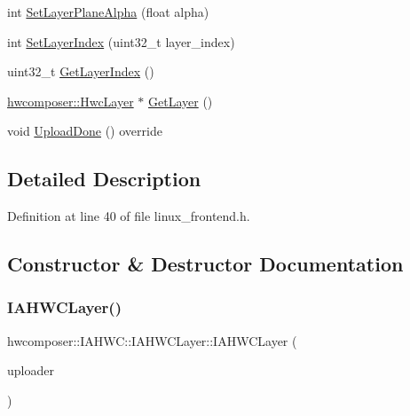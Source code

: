 \begin{DoxyCompactItemize}
\item 
int \mbox{\hyperlink{classhwcomposer_1_1IAHWC_1_1IAHWCLayer_ada748eee83ec62b8e3f242583ab2e0bb}{Set\+Layer\+Plane\+Alpha}} (float alpha)
\item 
int \mbox{\hyperlink{classhwcomposer_1_1IAHWC_1_1IAHWCLayer_a4e4374244d15639d4e94e6ac6aa33b92}{Set\+Layer\+Index}} (uint32\+\_\+t layer\+\_\+index)
\item 
uint32\+\_\+t \mbox{\hyperlink{classhwcomposer_1_1IAHWC_1_1IAHWCLayer_ad6659d6ae025b1945a6942bb53842930}{Get\+Layer\+Index}} ()
\item 
\mbox{\hyperlink{structhwcomposer_1_1HwcLayer}{hwcomposer\+::\+Hwc\+Layer}} $\ast$ \mbox{\hyperlink{classhwcomposer_1_1IAHWC_1_1IAHWCLayer_a1c86b8885b0b4cb9cb431fc1e139222d}{Get\+Layer}} ()
\item 
void \mbox{\hyperlink{classhwcomposer_1_1IAHWC_1_1IAHWCLayer_a70158d804e3bf021d32847ffaa33d98d}{Upload\+Done}} () override
\end{DoxyCompactItemize}


\subsection{Detailed Description}


Definition at line 40 of file linux\+\_\+frontend.\+h.



\subsection{Constructor \& Destructor Documentation}
\mbox{\label{classhwcomposer_1_1IAHWC_1_1IAHWCLayer_ae122add62cc7f3cd678c50e496d4c47a}} 
\subsubsection{\texorpdfstring{I\+A\+H\+W\+C\+Layer()}{IAHWCLayer()}}
{\footnotesize\ttfamily hwcomposer\+::\+I\+A\+H\+W\+C\+::\+I\+A\+H\+W\+C\+Layer\+::\+I\+A\+H\+W\+C\+Layer (\begin{DoxyParamCaption}\item[{\mbox{\hyperlink{classhwcomposer_1_1PixelUploader}{Pixel\+Uploader}} $\ast$}]{uploader }\end{DoxyParamCaption})}



